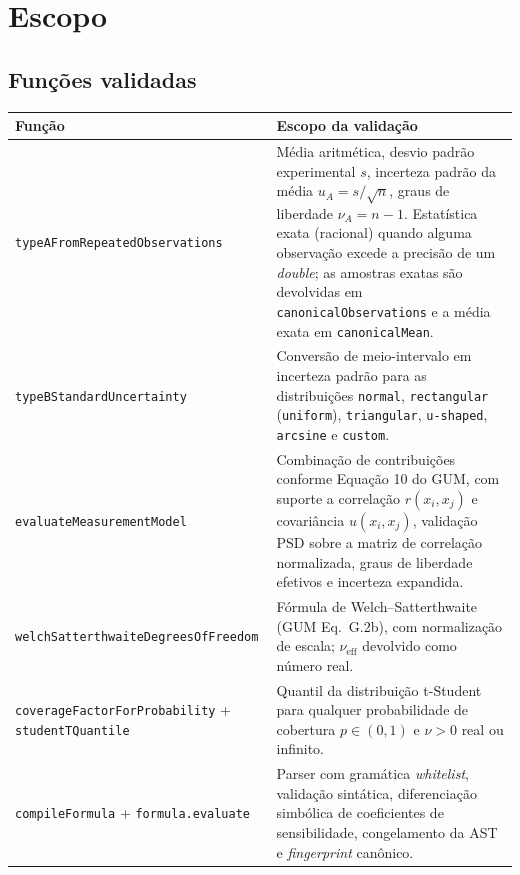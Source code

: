 \documentclass[11pt,a4paper]{article}
\begin{document}
\section{Escopo}
\label{sec:escopo}

\subsection{Funções validadas}

\begin{table}[H]
  \centering
  \small
  \begin{tabularx}{\textwidth}{l X}
    \toprule
    \textbf{Função} & \textbf{Escopo da validação} \\
    \midrule
    \texttt{typeAFromRepeatedObservations} & Média aritmética, desvio padrão experimental \(s\), incerteza padrão da média \(u_A = s/\sqrt{n}\), graus de liberdade \(\nu_A = n - 1\). Estatística exata (racional) quando alguma observação excede a precisão de um \emph{double}; as amostras exatas são devolvidas em \texttt{canonicalObservations} e a média exata em \texttt{canonicalMean}. \\
    \texttt{typeBStandardUncertainty} & Conversão de meio-intervalo em incerteza padrão para as distribuições \texttt{normal}, \texttt{rectangular} (\texttt{uniform}), \texttt{triangular}, \texttt{u-shaped}, \texttt{arcsine} e \texttt{custom}. \\
    \texttt{evaluateMeasurementModel} & Combinação de contribuições conforme Equação 10 do GUM, com suporte a correlação \(r(x_i, x_j)\) e covariância \(u(x_i, x_j)\), validação PSD sobre a matriz de correlação normalizada, graus de liberdade efetivos e incerteza expandida. \\
    \texttt{welchSatterthwaiteDegreesOfFreedom} & Fórmula de Welch--Satterthwaite (GUM Eq.~G.2b), com normalização de escala; \(\nu_{\text{eff}}\) devolvido como número real. \\
    \texttt{coverageFactorForProbability} + \texttt{studentTQuantile} & Quantil da distribuição t-Student para qualquer probabilidade de cobertura \(p \in (0,1)\) e \(\nu > 0\) real ou infinito. \\
    \texttt{compileFormula} + \texttt{formula.evaluate} & Parser com gramática \emph{whitelist}, validação sintática, diferenciação simbólica de coeficientes de sensibilidade, congelamento da AST e \emph{fingerprint} canônico. \\
    \bottomrule
  \end{tabularx}
\end{table}
\end{document}
